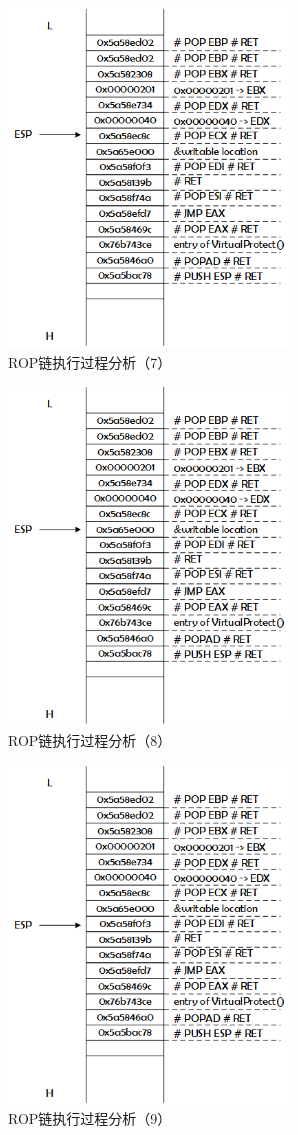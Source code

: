 \documentclass[bachelor]{thesis-uestc}
\begin{document}
\begin{figure}[htbp]
	\centering\includegraphics[height=9cm]{images/rop_chain_s7.png}
	\caption{ROP链执行过程分析（7）}
	\label{fig:rop_chain_s7}
\end{figure}

\begin{figure}[htbp]
	\centering\includegraphics[height=9cm]{images/rop_chain_s8.png}
	\caption{ROP链执行过程分析（8）}
	\label{fig:rop_chain_s8}
\end{figure}

\begin{figure}[htbp]
	\centering\includegraphics[height=9cm]{images/rop_chain_s9.png}
	\caption{ROP链执行过程分析（9）}
	\label{fig:rop_chain_s9}
\end{figure}
\end{document}
